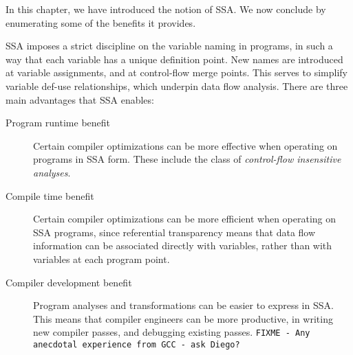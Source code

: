 In this chapter, we have introduced the notion of SSA.
We now conclude by enumerating some of the benefits it provides.

SSA imposes a strict discipline on the variable naming in programs,
in such a way that each variable has a unique definition point.
New names are introduced at variable assignments, and at control-flow
merge points.
This serves to simplify variable def-use relationships,
which underpin data flow analysis.
There are three main advantages that SSA enables:
\begin{description}
\item[Program runtime benefit]
Certain compiler optimizations can be more effective
when operating on programs in SSA form. These include the
class of \textit{control-flow insensitive analyses}.
\item[Compile time benefit]
Certain compiler optimizations can be more efficient
when operating on SSA programs, since
referential transparency means that data flow information
can be associated directly with variables, rather than with variables
at each program point.
\item[Compiler development benefit]
Program analyses and transformations can be easier
to express in SSA. This means that compiler engineers
can be more productive, in writing new compiler passes,
and debugging existing passes.
\texttt{FIXME - Any anecdotal experience from GCC - ask Diego?}
\end{description}



